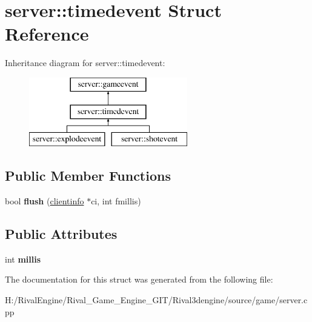 \hypertarget{structserver_1_1timedevent}{}\section{server\+:\+:timedevent Struct Reference}
\label{structserver_1_1timedevent}
Inheritance diagram for server\+:\+:timedevent\+:\begin{figure}[H]
\begin{center}
\leavevmode
\includegraphics[height=3.000000cm]{structserver_1_1timedevent}
\end{center}
\end{figure}
\subsection*{Public Member Functions}
\begin{DoxyCompactItemize}
\item 
\mbox{\label{structserver_1_1timedevent_a41ca30a56459d5ab0033c9b20dbd44a0}} 
bool {\bfseries flush} (\hyperlink{structserver_1_1clientinfo}{clientinfo} $\ast$ci, int fmillis)
\end{DoxyCompactItemize}
\subsection*{Public Attributes}
\begin{DoxyCompactItemize}
\item 
\mbox{\label{structserver_1_1timedevent_a59f27cac057e3acf9dce58049cd9db36}} 
int {\bfseries millis}
\end{DoxyCompactItemize}


The documentation for this struct was generated from the following file\+:\begin{DoxyCompactItemize}
\item 
H\+:/\+Rival\+Engine/\+Rival\+\_\+\+Game\+\_\+\+Engine\+\_\+\+G\+I\+T/\+Rival3dengine/source/game/server.\+cpp\end{DoxyCompactItemize}
